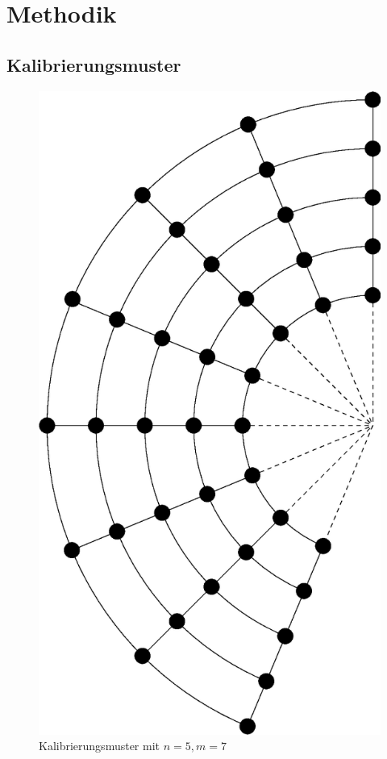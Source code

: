 \chapter{Methodik}
\label{ch:method}


\section{Kalibrierungsmuster}
\label{s:calibrationPattern}

\begin{figure}[!htb]
	\centering
	\includegraphics[scale=.4]{images/calibrationPattern.eps}
	\caption{Kalibrierungsmuster mit $n = 5, m = 7$}
	\label{fig:calibrationPattern}
\end{figure}
